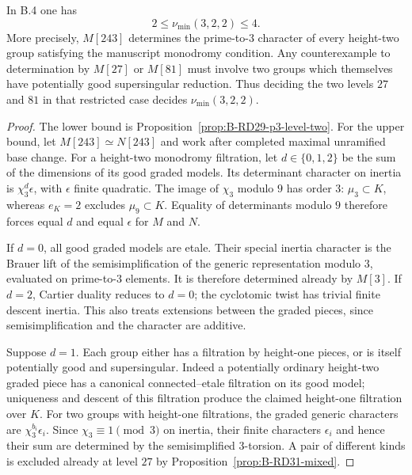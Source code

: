 \begin{theorem}
\label{thm:B-RD31}
In B.4 one has
\[
                         2\leq\nu_{\min}(3,2,2)\leq4.
                                                        \tag{B-RD31.5}
\]
More precisely, $M[243]$ determines the prime-to-$3$ character
of every height-two group satisfying the manuscript monodromy
condition. Any counterexample to determination by $M[27]$ or
$M[81]$ must involve two groups which themselves have
potentially good supersingular reduction. Thus deciding the
two levels $27$ and $81$ in that restricted case decides
$\nu_{\min}(3,2,2)$.
\end{theorem}
\begin{proof}
The lower bound is Proposition~\ref{prop:B-RD29-p3-level-two}.
For the upper bound, let $M[243]\simeq N[243]$ and work after
completed maximal unramified base change. For a height-two
monodromy filtration, let $d\in\{0,1,2\}$ be the sum of the
dimensions of its good graded models. Its determinant character
on inertia is $\chi_3^d\epsilon$, with $\epsilon$ finite
quadratic. The image of $\chi_3$ modulo $9$ has order $3$:
$\mu_3\subset K$, whereas $e_K=2$ excludes $\mu_9\subset K$.
Equality of determinants modulo $9$ therefore forces equal $d$
and equal $\epsilon$ for $M$ and $N$.

If $d=0$, all good graded models are etale. Their special
inertia character is the Brauer lift of the semisimplification
of the generic representation modulo $3$, evaluated on
prime-to-$3$ elements. It is therefore determined already by
$M[3]$. If $d=2$, Cartier duality reduces to $d=0$; the
cyclotomic twist has trivial finite descent inertia. This
also treats extensions between the graded pieces, since
semisimplification and the character are additive.

Suppose $d=1$. Each group either has a filtration by height-one
pieces, or is itself potentially good and supersingular.
Indeed a potentially ordinary height-two graded piece has a
canonical connected--etale filtration on its good model;
uniqueness and descent of this filtration produce the claimed
height-one filtration over $K$.
For two groups with height-one filtrations, the graded generic
characters are $\chi_3^{b_i}\epsilon_i$. Since
$\chi_3\equiv1\pmod3$ on inertia, their finite characters
$\epsilon_i$ and hence their sum are determined by the
semisimplified $3$-torsion. A pair of different kinds is excluded
already at level $27$ by Proposition~\ref{prop:B-RD31-mixed}.


\end{proof}

